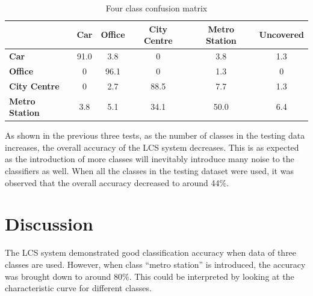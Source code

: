 \documentclass[11pt]{article}
\begin{document}
\begin{table}[!htbp]
	\centering
	\caption{Four class confusion matrix}
	\label{tab:conf4}
	\begin{tabularx}{0.9\textwidth}{lccccc}
		\toprule
		                       & \textbf{Car} & \textbf{Office} & \textbf{City Centre} & \textbf{Metro Station} & \textbf{Uncovered} \\ \midrule
		\textbf{Car}           &     91.0     &       3.8       &          0           & 3.8                    &        1.3         \\
		\textbf{Office}        &      0       &      96.1       &          0           & 1.3                    &         0          \\
		\textbf{City Centre}   &      0       &       2.7       &         88.5         & 7.7                    &        1.3         \\ \bottomrule
		\textbf{Metro Station} &     3.8      &       5.1       &         34.1         & 50.0                   &        6.4 \\ \bottomrule
	\end{tabularx}
\end{table}




As shown in the previous three tests, as the number of classes in the testing data increases, the overall accuracy of the LCS system decreases. This is as expected as the introduction of more classes will inevitably introduce many noise to the classifiers as well.  When all the classes in the testing dataset were used, it was observed that the overall accuracy decreased to around 44\%. 




\section{Discussion}

The LCS system demonstrated good classification accuracy when data of three classes are used. However, when class ``metro station'' is introduced, the accuracy was brought down to around 80\%. This could be interpreted by looking at the characteristic curve for different classes.
\end{document}
